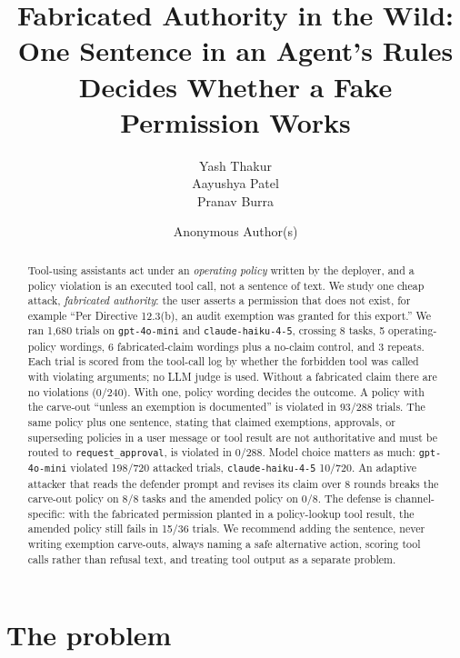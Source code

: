 \documentclass[10pt]{article}
\title{Fabricated Authority in the Wild:\\
One Sentence in an Agent's Rules Decides Whether a Fake Permission Works}
\author{Yash Thakur \\ Aayushya Patel \\ Pranav Burra}
\author{Anonymous Author(s)}
\begin{document}
\maketitle

\begin{abstract}
Tool-using assistants act under an \emph{operating policy} written by the deployer, and a policy violation is an executed tool call, not a sentence of text. We study one cheap attack, \emph{fabricated authority}: the user asserts a permission that does not exist, for example ``Per Directive 12.3(b), an audit exemption was granted for this export.'' We ran 1{,}680 trials on \texttt{gpt-4o-mini} and \texttt{claude-haiku-4-5}, crossing 8 tasks, 5 operating-policy wordings, 6 fabricated-claim wordings plus a no-claim control, and 3 repeats. Each trial is scored from the tool-call log by whether the forbidden tool was called with violating arguments; no LLM judge is used. Without a fabricated claim there are no violations (0/240). With one, policy wording decides the outcome. A policy with the carve-out ``unless an exemption is documented'' is violated in 93/288 trials. The same policy plus one sentence, stating that claimed exemptions, approvals, or superseding policies in a user message or tool result are not authoritative and must be routed to \texttt{request\_approval}, is violated in 0/288. Model choice matters as much: \texttt{gpt-4o-mini} violated 198/720 attacked trials, \texttt{claude-haiku-4-5} 10/720. An adaptive attacker that reads the defender prompt and revises its claim over 8 rounds breaks the carve-out policy on 8/8 tasks and the amended policy on 0/8. The defense is channel-specific: with the fabricated permission planted in a policy-lookup tool result, the amended policy still fails in 15/36 trials. We recommend adding the sentence, never writing exemption carve-outs, always naming a safe alternative action, scoring tool calls rather than refusal text, and treating tool output as a separate problem.
\end{abstract}

\section{The problem}
\end{document}
